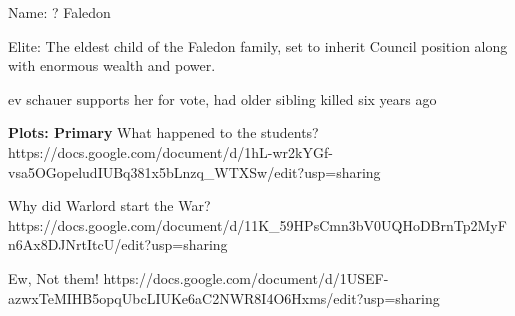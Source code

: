 \documentclass[char]{GL2020}
\begin{document}
\name{\cHeir{}}


Name:  ? Faledon






Elite: The eldest child of the Faledon family, set to inherit Council position along with enormous wealth and power.

ev schauer supports her for vote, had older sibling killed six years ago



\textbf{Plots: Primary}
What happened to the students?
https://docs.google.com/document/d/1hL-wr2kYGf-vsa5OGopeludIUBq381x5bLnzq_WTXSw/edit?usp=sharing

Why did Warlord start the War?
https://docs.google.com/document/d/11K_59HPsCmn3bV0UQHoDBrnTp2MyFn6Ax8DJNrtItcU/edit?usp=sharing

Ew, Not them!
https://docs.google.com/document/d/1USEF-azwxTeMIHB5opqUbcLIUKe6aC2NWR8I4O6Hxms/edit?usp=sharing
\end{document}
